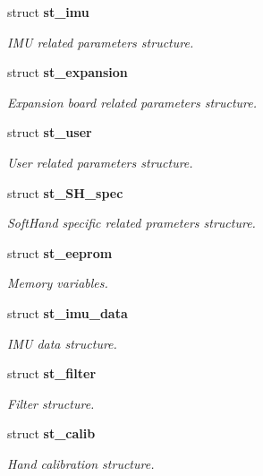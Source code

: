 \begin{DoxyCompactItemize}
struct \textbf{ st\+\_\+imu}
\begin{DoxyCompactList}\small\item\em I\+MU related parameters structure. \end{DoxyCompactList}\item 
struct \textbf{ st\+\_\+expansion}
\begin{DoxyCompactList}\small\item\em Expansion board related parameters structure. \end{DoxyCompactList}\item 
struct \textbf{ st\+\_\+user}
\begin{DoxyCompactList}\small\item\em User related parameters structure. \end{DoxyCompactList}\item 
struct \textbf{ st\+\_\+\+S\+H\+\_\+spec}
\begin{DoxyCompactList}\small\item\em Soft\+Hand specific related prameters structure. \end{DoxyCompactList}\item 
struct \textbf{ st\+\_\+eeprom}
\begin{DoxyCompactList}\small\item\em Memory variables. \end{DoxyCompactList}\item 
struct \textbf{ st\+\_\+imu\+\_\+data}
\begin{DoxyCompactList}\small\item\em I\+MU data structure. \end{DoxyCompactList}\item 
struct \textbf{ st\+\_\+filter}
\begin{DoxyCompactList}\small\item\em Filter structure. \end{DoxyCompactList}\item 
struct \textbf{ st\+\_\+calib}
\begin{DoxyCompactList}\small\item\em Hand calibration structure. \end{DoxyCompactList}\end{DoxyCompactItemize}
